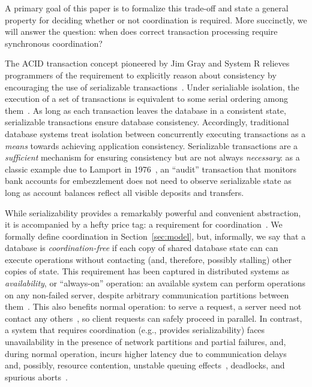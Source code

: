 A primary goal of this paper is to formalize this trade-off and state
a general property for deciding whether or not coordination is
required. More succinctly, we will answer the question: when does
correct transaction processing require synchronous coordination?


 The ACID transaction concept
pioneered by Jim Gray and System R relieves programmers of the
requirement to explicitly reason about consistency by encouraging the
use of serializable transactions~\cite{gray-virtues}. Under
serialiable isolation, the execution of a set of transactions is
equivalent to some serial ordering among
them~\cite{bernstein-book}. As long as each transaction leaves the
database in a consistent state, serializable transactions ensure
database consistency. Accordingly, traditional database systems treat
isolation between concurrently executing transactions as a
\textit{means} towards achieving application consistency. Serializable
transactions are a \textit{sufficient} mechanism for ensuring
consistency but are not always \textit{necessary}: as a classic
example due to Lamport in
1976~\cite{lamport-audit,schneider-concurrent}, an ``audit''
transaction that monitors bank accounts for embezzlement does not need
to observe serializable state as long as account balances reflect all
visible deposits and transfers.


 While serializability provides a
remarkably powerful and convenient abstraction, it is accompanied by a
hefty price tag: a requirement for
coordination~\cite{davidson-survey}. We formally define coordination
in Section~\ref{sec:model}, but, informally, we say that a database is
\textit{coordination-free} if each copy of shared database state can
can execute operations without contacting (and, therefore, possibly
stalling) other copies of state. This requirement has been captured in
distributed systems as \textit{availability}, or ``always-on''
operation: an available system can perform operations on any
non-failed server, despite arbitrary communication partitions between
them~\cite{gilbert-cap}. This also benefits normal operation: to serve
a request, a \cfree server need not contact any others~\cite{pacelc},
so client requests can safely proceed in parallel. In contrast, a
system that requires coordination (e.g., provides serializability)
faces unavailability in the presence of network partitions and partial
failures, and, during normal operation, incurs higher latency due to
communication delays~\cite{hat-vldb} and, possibly, resource
contention, unstable queuing effects~\cite{ladis}, deadlocks, and
spurious aborts~\cite{bernstein-book,gray-virtues}.

